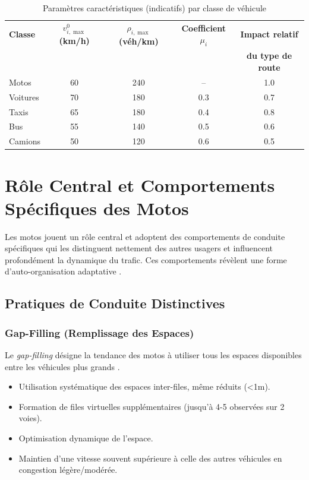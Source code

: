 \begin{table}[htbp]
    \centering
    \caption{Paramètres caractéristiques (indicatifs) par classe de véhicule} %
    \label{tab:parametres_vehicules} %
    \begin{tabular}{lcccc}
        \toprule
        \textbf{Classe} & \textbf{$v_{i,\max}^0$ (km/h)} & \textbf{$\rho_{i,\max}$ (véh/km)} & \textbf{Coefficient $\mu_i$} & \textbf{Impact relatif} \\
         & & & & \textbf{du type de route} \\
        \midrule
        Motos & 60 & 240 & -- & 1.0 \\
        Voitures & 70 & 180 & 0.3 & 0.7 \\
        Taxis & 65 & 180 & 0.4 & 0.8 \\
        Bus & 55 & 140 & 0.5 & 0.6 \\
        Camions & 50 & 120 & 0.6 & 0.5 \\
        \bottomrule
    \end{tabular}
\end{table}

\section{Rôle Central et Comportements Spécifiques des Motos}
\label{sec:comportements_motos}

Les motos jouent un rôle central et adoptent des comportements de conduite spécifiques qui les distinguent nettement des autres usagers et influencent profondément la dynamique du trafic. Ces comportements révèlent une forme d'auto-organisation adaptative \cite{loggoh2019traffic, aerc2019taxi}.

\subsection{Pratiques de Conduite Distinctives}
\label{subsec:pratiques_conduite}

\subsubsection{Gap-Filling (Remplissage des Espaces)}
\label{subsubsec:gap_filling}
Le \textit{gap-filling} désigne la tendance des motos à utiliser tous les espaces disponibles entre les véhicules plus grands \cite{fan2013heterogeneous, kumar2018motorcycle}.
\begin{itemize}
    \item Utilisation systématique des espaces inter-files, même réduits (<1m).
    \item Formation de files virtuelles supplémentaires (jusqu'à 4-5 observées sur 2 voies).
    \item Optimisation dynamique de l'espace.
    \item Maintien d'une vitesse souvent supérieure à celle des autres véhicules en congestion légère/modérée.
\end{itemize}


